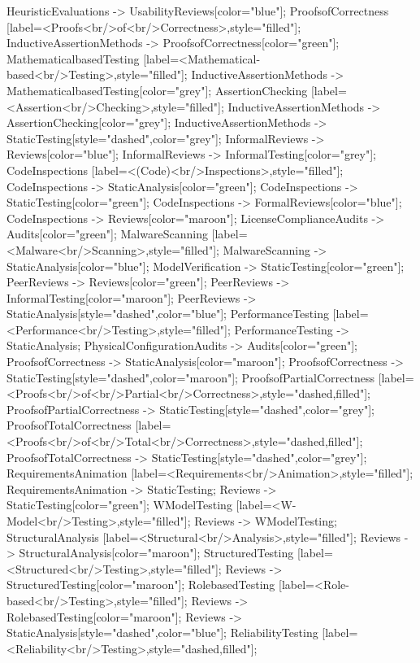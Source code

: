 \documentclass{article}
\begin{document}
{HeuristicEvaluations -> UsabilityReviews[color="blue"];
ProofsofCorrectness [label=<Proofs<br/>of<br/>Correctness>,style="filled"];
InductiveAssertionMethods -> ProofsofCorrectness[color="green"];
MathematicalbasedTesting [label=<Mathematical-based<br/>Testing>,style="filled"];
InductiveAssertionMethods -> MathematicalbasedTesting[color="grey"];
AssertionChecking [label=<Assertion<br/>Checking>,style="filled"];
InductiveAssertionMethods -> AssertionChecking[color="grey"];
InductiveAssertionMethods -> StaticTesting[style="dashed",color="grey"];
InformalReviews -> Reviews[color="blue"];
InformalReviews -> InformalTesting[color="grey"];
CodeInspections [label=<(Code)<br/>Inspections>,style="filled"];
CodeInspections -> StaticAnalysis[color="green"];
CodeInspections -> StaticTesting[color="green"];
CodeInspections -> FormalReviews[color="blue"];
CodeInspections -> Reviews[color="maroon"];
LicenseComplianceAudits -> Audits[color="green"];
MalwareScanning [label=<Malware<br/>Scanning>,style="filled"];
MalwareScanning -> StaticAnalysis[color="blue"];
ModelVerification -> StaticTesting[color="green"];
PeerReviews -> Reviews[color="green"];
PeerReviews -> InformalTesting[color="maroon"];
PeerReviews -> StaticAnalysis[style="dashed",color="blue"];
PerformanceTesting [label=<Performance<br/>Testing>,style="filled"];
PerformanceTesting -> StaticAnalysis;
PhysicalConfigurationAudits -> Audits[color="green"];
ProofsofCorrectness -> StaticAnalysis[color="maroon"];
ProofsofCorrectness -> StaticTesting[style="dashed",color="maroon"];
ProofsofPartialCorrectness [label=<Proofs<br/>of<br/>Partial<br/>Correctness>,style="dashed,filled"];
ProofsofPartialCorrectness -> StaticTesting[style="dashed",color="grey"];
ProofsofTotalCorrectness [label=<Proofs<br/>of<br/>Total<br/>Correctness>,style="dashed,filled"];
ProofsofTotalCorrectness -> StaticTesting[style="dashed",color="grey"];
RequirementsAnimation [label=<Requirements<br/>Animation>,style="filled"];
RequirementsAnimation -> StaticTesting;
Reviews -> StaticTesting[color="green"];
WModelTesting [label=<W-Model<br/>Testing>,style="filled"];
Reviews -> WModelTesting;
StructuralAnalysis [label=<Structural<br/>Analysis>,style="filled"];
Reviews -> StructuralAnalysis[color="maroon"];
StructuredTesting [label=<Structured<br/>Testing>,style="filled"];
Reviews -> StructuredTesting[color="maroon"];
RolebasedTesting [label=<Role-based<br/>Testing>,style="filled"];
Reviews -> RolebasedTesting[color="maroon"];
Reviews -> StaticAnalysis[style="dashed",color="blue"];
ReliabilityTesting [label=<Reliability<br/>Testing>,style="dashed,filled"];
}
\end{document}
